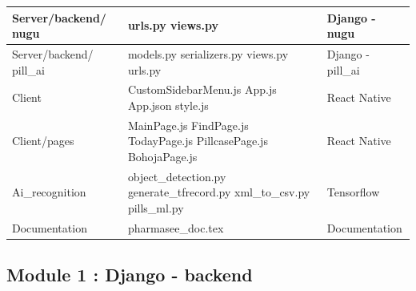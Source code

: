 \documentclass[conference]{IEEEtran}
\begin{document}
\begin{table}[h!]
\begin{tabular}{|p{}|p{}|p{}|}
\hline
Server/backend/ nugu &urls.py \newline\newline views.py&Django - nugu\\
\hline
Server/backend/ pill\_ai &models.py \newline\newline serializers.py \newline\newline views.py \newline\newline urls.py&Django - pill\_ai\\
\hline
Client &CustomSidebarMenu.js \newline\newline App.js \newline\newline App.json \newline\newline style.js &React Native \\
\hline
Client/pages &MainPage.js \newline\newline FindPage.js \newline\newline TodayPage.js \newline\newline PillcasePage.js \newline\newline BohojaPage.js &React Native \\
\hline
Ai\_recognition &  object\_detection.py \newline\newline generate\_tfrecord.py  \newline\newline xml\_to\_csv.py  \newline\newline pills\_ml.py & Tensorflow \\
\hline
Documentation&pharmasee\_doc.tex&Documentation\\
\hline
\end{tabular}
\label{tab1}
\end{table}

\subsection{Module 1 : Django - backend}
\end{document}
